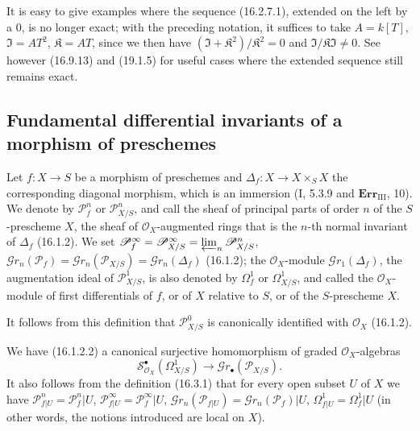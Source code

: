 It is easy to give examples where the sequence (16.2.7.1), extended on the left
by a 0, is no longer exact; with the preceding notation, it suffices to
take $A=k[T]$, $\mathfrak{I}=AT^2$, $\mathfrak{K}=AT$, since we then have
$(\mathfrak{I}+\mathfrak{K}^2)/\mathfrak{K}^2=0$ and
$\mathfrak{I}/\mathfrak{K}\mathfrak{I}\neq 0$. See however (16.9.13) and
(19.1.5) for useful cases where the extended sequence still remains exact.

\subsection{Fundamental differential invariants of a morphism of preschemes}

\begin{definition}[16.3.1]\label{IV.16.3.1}
Let $f:X\to S$ be a morphism of preschemes and $\Delta_f:X\to X\times_S X$
the corresponding diagonal morphism, which is an immersion (I, 5.3.9 and
$\mathbf{Err}_{\mathrm{III}}$, 10). We denote by $\mathscr{P}_f^n$ or
$\mathscr{P}_{X/S}^n$, and call the sheaf of principal parts of order $n$
of the $S$-prescheme $X$, the sheaf of $\mathcal{O}_X$-augmented rings that is the
$n$-th normal invariant of $\Delta_f$ (16.1.2). We set
$\mathscr{P}_f^\infty=\mathscr{P}_{X/S}^\infty=
\varprojlim_n\mathscr{P}_{X/S}^n$,
$\mathscr{G}r_n(\mathscr{P}_f)=\mathscr{G}r_n(\mathscr{P}_{X/S})=
\mathscr{G}r_n(\Delta_f)$ (16.1.2); the $\mathcal{O}_X$-module
$\mathscr{G}r_1(\Delta_f)$, the augmentation ideal of $\mathscr{P}_{X/S}^1$, is
also denoted by $\Omega_f^1$ or $\Omega_{X/S}^1$, and called the $\mathcal{O}_X$-module
of first differentials of $f$, or of $X$ relative to $S$, or of the $S$-prescheme $X$.
\end{definition}

It follows from this definition that $\mathscr{P}_{X/S}^0$ is
canonically identified with $\mathcal{O}_X$ (16.1.2).

We have (16.1.2.2) a canonical surjective homomorphism of
graded $\mathcal{O}_X$-algebras
\[
  \mathscr{S}_{\mathcal{O}_X}^{\bullet}(\Omega_{X/S}^1)
  \longrightarrow\mathscr{G}r_\bullet(\mathscr{P}_{X/S}).
  \tag{16.3.1.1}
  \label{IV.16.3.1.1}
\]
It also follows from the definition (16.3.1) that for every open subset $U$ of $X$ we have
$\mathscr{P}_{f|U}^n=\mathscr{P}_f^n|U$,
$\mathscr{P}_{f|U}^\infty=\mathscr{P}_f^\infty|U$,
$\mathscr{G}r_n(\mathscr{P}_{f|U})=\mathscr{G}r_n(\mathscr{P}_f)|U$,
$\Omega_{f|U}^1=\Omega_f^1|U$ (in other words, the notions introduced are
local on $X$).

